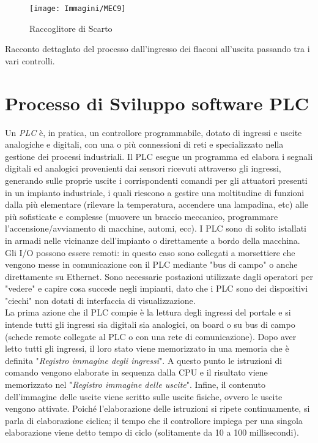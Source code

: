 \documentclass[12pt, a4paper, oneside]{book}
\begin{document}
\begin{figure}[H]
	\centering
	\texttt{[image: Immagini/MEC9]}
	\label{mec9}
	\caption{ Raccoglitore di Scarto}
\end{figure}
 
Racconto dettaglato del processo dall'ingresso dei flaconi all'uscita passando tra i vari controlli.
\chapter{Processo di Sviluppo software PLC}
Un \textit{PLC} è, in pratica, un controllore programmabile, dotato di ingressi e uscite analogiche e digitali, con una o più connessioni di reti e specializzato nella gestione dei processi industriali. Il PLC esegue un programma ed elabora i segnali digitali ed analogici provenienti dai sensori ricevuti attraverso gli ingressi, generando sulle proprie uscite i corrispondenti comandi per gli attuatori presenti in un impianto industriale, i quali riescono a gestire una moltitudine di funzioni dalla più elementare (rilevare la temperatura, accendere una lampadina, etc) alle più sofisticate e complesse (muovere un braccio meccanico, programmare l’accensione/avviamento di macchine, automi, ecc). 
I PLC sono di solito istallati in armadi nelle vicinanze dell'impianto o direttamente a bordo della macchina. Gli I/O possono essere remoti: in questo caso sono collegati a morsettiere che vengono messe in comunicazione con il PLC mediante "bus di campo" o anche direttamente su Ethernet. Sono necessarie postazioni utilizzate dagli operatori per "vedere" e capire cosa succede negli impianti, dato che i PLC sono dei dispositivi "ciechi" non dotati di interfaccia di visualizzazione.
\\La prima azione che il PLC compie è la lettura degli ingressi del portale e si intende tutti gli ingressi sia digitali sia analogici, on board o su bus di campo (schede remote collegate al PLC o con una rete di comunicazione). Dopo aver letto tutti gli ingressi, il loro stato viene memorizzato in una memoria che è definita "\textit{Registro immagine degli ingressi}". A questo punto le istruzioni di comando vengono elaborate in sequenza dalla CPU e il risultato viene memorizzato nel "\textit{Registro immagine delle uscite}". Infine, il contenuto dell'immagine delle uscite viene scritto sulle uscite fisiche, ovvero le uscite vengono attivate. Poiché l'elaborazione delle istruzioni si ripete continuamente, si parla di elaborazione ciclica; il tempo che il controllore impiega per una singola elaborazione viene detto tempo di ciclo (solitamente da 10 a 100 millisecondi).
\end{document}

